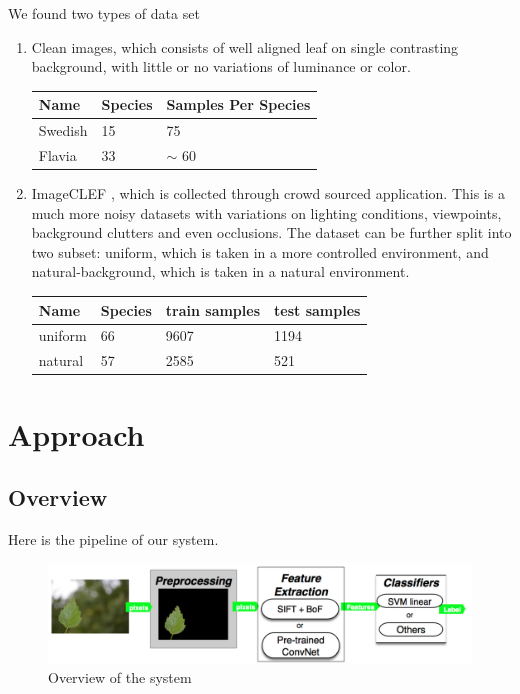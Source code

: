 \documentclass[journal, 10pt]{IEEEtran}
\begin{document}
    We found two types of data set
\begin{enumerate}
  \item Clean images, which consists of well aligned leaf on single contrasting background, with little or no variations of luminance or color. \\
  \begin{center}
      \begin{tabular}{| l | l | l |}
      \hline
      Name & Species & Samples Per Species        \\ \hline
      Swedish \cite{SwedishLeafDataset} & 15 & 75        \\ \hline
      Flavia \cite{FlaviaDataset}       & 33 & $\sim$ 60 \\ \hline
      \end{tabular}
  \end{center}

  \item ImageCLEF \cite{ImageCLEF2013}, which is collected through crowd sourced application. This is a much more noisy datasets with variations on lighting conditions, viewpoints, background clutters and even occlusions. The dataset can be further split into two subset: uniform, which is taken in a more controlled environment, and natural-background, which is taken in a natural environment.
  \begin{center}
      \begin{tabular}{| l | l | l | l |}
      \hline
      Name    & Species & train samples & test samples \\ \hline
      uniform & 66      & 9607         & 1194         \\ \hline
      natural & 57      & 2585          & 521          \\ \hline
      \end{tabular}
  \end{center}
\end{enumerate}

\section{Approach}

\subsection{Overview}
Here is the pipeline of our system.
\begin{figure}[H]
  \center
  \includegraphics[width=1.0\linewidth]{overview}
  \caption{ Overview of the system }
  \label{fig:pipeline}
\end{figure}
\end{document}
